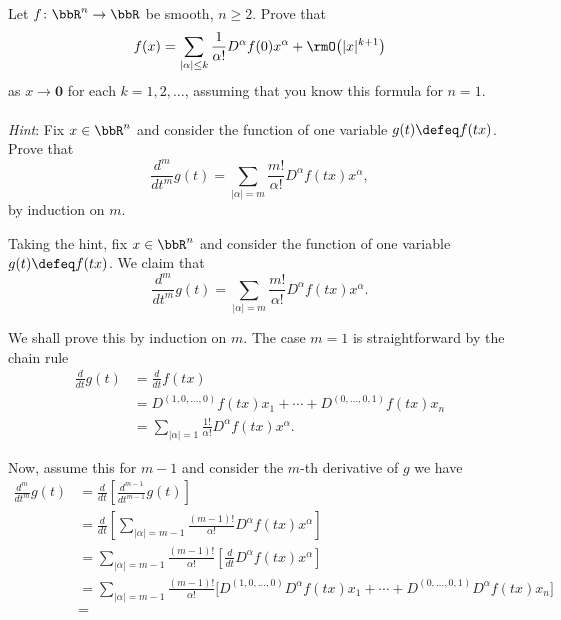 \begin{problem}
  Let \(f\colon\bbR^n\to\bbR\) be smooth, \(n\geq 2\). Prove that
  \[
    f(x)=\sum_{|\alpha|\leq k}
    \frac{1}{\alpha!}D^\alpha f(0)x^\alpha+\rmO\bigl(|x|^{k+1}\bigr)
  \]
  as \(x\to\mathbf{0}\) for each \(k=1,2,\dotsc\), assuming that you know this
  formula for \(n=1\).
  \\\\
  \emph{Hint}: Fix \(x\in\bbR^n\) and consider the function of one variable
  \(g(t)\defeq f(tx)\). Prove that
  \[
    \frac{d^m}{d t^m}g(t)
    =\sum_{|\alpha|=m}\frac{m!}{\alpha!} D^\alpha f(tx)x^\alpha,
  \]
  by induction on \(m\).
\end{problem}
\begin{solution}
  Taking the hint, fix \(x\in\bbR^n\) and consider the function of one
  variable \(g(t)\defeq f(tx)\). We claim that
  \[
    \frac{d^m}{d t^m}g(t)%
    =\sum_{|\alpha|=m}\frac{m!}{\alpha!}D^\alpha f(tx)x^\alpha.%
  \]
  \begin{subproof}
    We shall prove this by induction on \(m\). The case \(m=1\) is
    straightforward by the chain rule
    \begin{align*}
      \frac{d}{dt}g(t)
      &=\frac{d}{dt}f(tx)\\
      &=D^{(1,0,\dotsc,0)}f(tx)x_1+\dotsb+D^{(0,\dotsc,0,1)}f(tx)x_n\\
      &=\sum_{|\alpha|=1}\frac{1!}{\alpha!}D^\alpha f(tx)x^\alpha.
    \end{align*}

    Now, assume this for \(m-1\) and consider the \(m\)-th derivative of
    \(g\) we have
    \begin{align*}
      \frac{d^m}{dt^m}g(t)
      &=\frac{d}{dt}\left[\frac{d^{m-1}}{dt^{m-1}}g(t)\right]\\
      &=\frac{d}{dt}
        \left[
        \sum\nolimits_{|\alpha|=m-1}\frac{(m-1)!}{\alpha!}D^\alpha f(tx)x^\alpha
        \right]\\
      &=\sum_{|\alpha|=m-1}\frac{(m-1)!}{\alpha!}
        \left[\frac{d}{dt}D^\alpha f(tx)x^\alpha\right]\\
      &=\sum_{|\alpha|=m-1}\frac{(m-1)!}{\alpha!}
        \bigl[
        D^{(1,0,\dotsc,0)}D^\alpha
        f(tx)x_1+\dotsb+D^{(0,\dotsc,0,1)}D^\alpha f(tx)x_n
        \bigr]\\
      &=
    \end{align*}
  \end{subproof}
\end{solution}
\newpage


